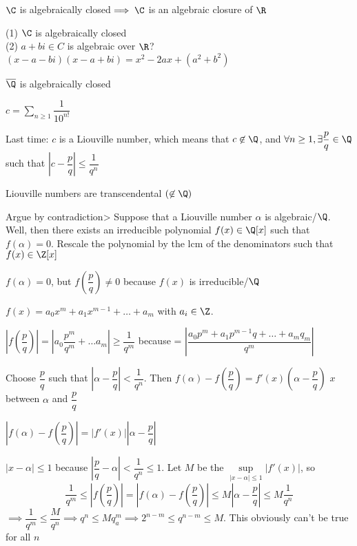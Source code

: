 \documentclass[twoside, 10pt]{article}
\begin{document}
\begin{exm*}
    $\C$ is algebraically closed$\implies \C$ is an algebraic closure of $\R$
\end{exm*}
(1) $\C$ is algebraically closed\\
(2) $a + bi \in C$ is algebraic over $\R$? $(x - a - bi)(x - a + bi) = x^2 - 2ax + (a^2 + b^2)$

\begin{exm*}
    $\overline{\Q}$ is algebraically closed
\end{exm*}

\begin{exm*}
    $c = \sum\limits_{n \geq 1} \dfrac{1}{10^{n!}}$
\end{exm*}
Last time: $c$ is a Liouville number, which means that $c\not\in\Q$, and $\forall n \geq 1, \exists \dfrac{p}{q} \in \Q$ such that $\left| c - \dfrac{p}{q}\right| \leq \dfrac{1}{q^n}$

\begin{lem}
    Liouville numbers are transcendental $(\not\in \Q)$
\end{lem}
Argue by contradiction> Suppose that a Liouville number $\alpha$ is algebraic/$\Q$. Well, then there exists an irreducible polynomial $f(x) \in \Q[x]$ such that $f(\alpha) = 0$. Rescale the polynomial by the lcm of the denominators such that $f(x) \in \Z[x]$

$f(\alpha) = 0$, but $f(\dfrac{p}{q}) \neq 0$ because $f(x)$ is irreducible/$\Q$

$f(x) = a_0x^m + a_1 x^{m-1} + \ldots + a_m$ with $a_i \in \Z$.

$\left|f(\dfrac{p}{q})\right| = |a_0 \dfrac{p^m}{q^m} + \ldots a_m| \geq \dfrac{1}{q^m}$ because = $\left|\dfrac{a_0p^m + a_1p^{m-1}q + \ldots + a_mq_m}{q^m}\right|$

Choose $\dfrac{p}{q}$ such that $\left| \alpha - \dfrac{p}{q}\right| < \dfrac{1}{q^n}$. Then $f(\alpha) - f(\dfrac{p}{q}) = f'(x)(\alpha - \dfrac{p}{q})$ $x$ between $\alpha$ and $\dfrac{p}{q}$

$\left|f(\alpha) - f(\dfrac{p}{q})\right|  = \left|f'(x)\right|\left|\alpha - \dfrac{p}{q}\right|$ 

$|x - \alpha| \leq 1$ because $\left| \dfrac{p}{q} - \alpha\right| < \dfrac{1}{q^n} \leq 1$. Let $M$ be the $\sup\limits_{|x - \alpha| \leq 1}\left|f'(x)\right|$, so $$\dfrac{1}{q^m} \leq \left|f(\dfrac{p}{q})\right| = \left|f(\alpha) - f(\dfrac{p}{q})\right| \leq M\left| \alpha - \dfrac{p}{q}\right| \leq M\dfrac{1}{q^n}$$
$\implies \dfrac{1}{q^m} \leq \dfrac{M}{q^n} \implies q^n \leq Mq_a^m \implies 2^{n-m } \leq q^{n-m} \leq M$. This obviously can't be true for all $n$
\end{document}
